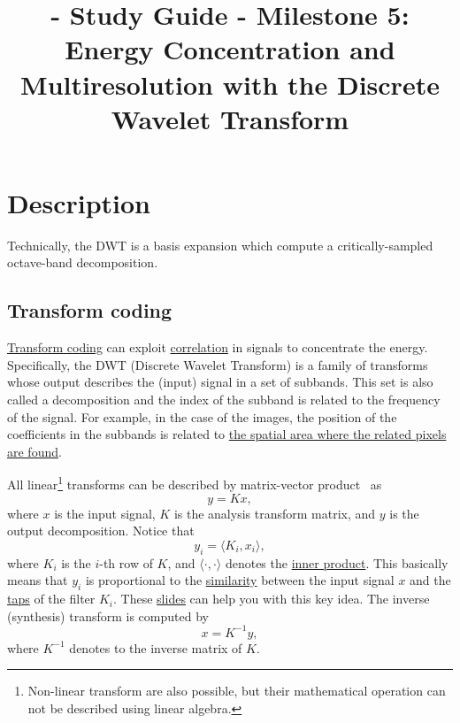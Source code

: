 
\title{\SM{} - Study Guide - Milestone 5: Energy Concentration and Multiresolution  with the Discrete Wavelet Transform}

\maketitle

\section{Description}

Technically, the DWT is a basis expansion which compute a
critically-sampled octave-band decomposition.

\subsection{Transform coding}

\href{https://web.stanford.edu/class/ee398a/handouts/lectures/07-TransformCoding.pdf}{Transform
  coding} can exploit
\href{https://en.wikipedia.org/wiki/Correlation_and_dependence}{correlation}
in signals to concentrate the energy. Specifically, the DWT (Discrete
Wavelet Transform) is a family of transforms whose output describes
the (input) signal in a set of subbands. This set is also called a
decomposition and the index of the subband is related to the frequency
of the signal. For example, in the case of the images, the position of
the coefficients in the subbands is related to
\href{https://en.wikipedia.org/wiki/Discrete_wavelet_transform#/media/File:Jpeg2000_2-level_wavelet_transform-lichtenstein.png}{the
  spatial area where the related pixels are found}.

All linear\footnote{Non-linear transform are also possible, but their
  mathematical operation can not be described using linear algebra.}
transforms can be described by matrix-vector
product~\cite{strang4linear} as
\begin{equation}
  y = Kx,
  \label{eq:forward_transform_matrix_form}
\end{equation}
where $x$ is the input signal, $K$ is the analysis transform matrix,
and $y$ is the output decomposition. Notice that
\begin{equation}
  y_i = \langle K_i, x_i\rangle,
\end{equation}
where $K_i$ is the $i$-th row of $K$, and $\langle\cdot,\cdot\rangle$
denotes the
\href{https://mathworld.wolfram.com/InnerProduct.html}{inner
  product}. This basically means that $y_i$ is proportional to the
\href{https://en.wikipedia.org/wiki/Similarity_(geometry)}{similarity}
between the input signal $x$ and the
\href{https://en.wikipedia.org/wiki/Finite_impulse_response}{taps} of
the filter $K_i$. These
\href{https://cseweb.ucsd.edu/classes/fa17/cse166-a/lec13.pdf}{slides}
can help you with this key idea. The inverse (synthesis) transform is
computed by
\begin{equation}
  x = K^{-1}y,
  \label{eq:backward_transform_matrix_form}
\end{equation}
where $K^{-1}$ denotes to the inverse matrix of $K$.

